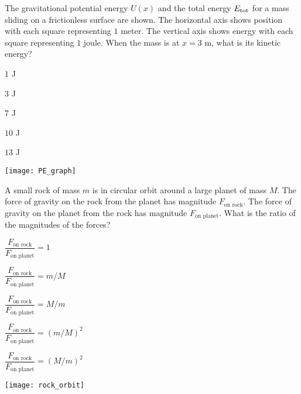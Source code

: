 \documentclass[11pt]{article}
\begin{document}
\begin{enumerate}
\begin{minipage}[t]{.6\lw}
\item The gravitational potential energy $U(x)$ and the total energy $E_{\rm tot}$ for a mass sliding on a frictionless surface are shown. The horizontal axis shows position with each square representing $1$ meter. The vertical axis shows energy with each square representing $1$ joule. When the mass is at $x=3$ m, what is its kinetic energy?
\begin{choices}
\item $1$ J
\item $3$ J
\item $7$ J
\item $10$ J
\item $13$ J
\end{choices}
\end{minipage}\hfill
\begin{minipage}[t]{.35\lw}
\vspace{0in}
\flushright
\texttt{[image: PE\_graph]}
\end{minipage}

\item A small rock of mass $m$ is in circular orbit around a large planet of mass $M$. The force of gravity on the rock from the planet has magnitude $F_\text{on rock}$. The force of gravity on the planet from the rock has magnitude $F_\text{on planet}$. What is the ratio of the magnitudes of the forces?\\
\begin{minipage}[t]{.65\lw}
\begin{choices}
\item $\dfrac{F_\text{on rock}}{F_\text{on planet}}=1$
\item $\dfrac{F_\text{on rock}}{F_\text{on planet}}=m/M$
\item $\dfrac{F_\text{on rock}}{F_\text{on planet}}=M/m$
\item $\dfrac{F_\text{on rock}}{F_\text{on planet}}=(m/M)^2$
\item $\dfrac{F_\text{on rock}}{F_\text{on planet}}=(M/m)^2$
\end{choices}
\end{minipage}\hfill
\begin{minipage}[t]{.3\lw}
\vspace{0in}
\flushright
\texttt{[image: rock\_orbit]}
\end{minipage}


\end{enumerate}
\end{document}
